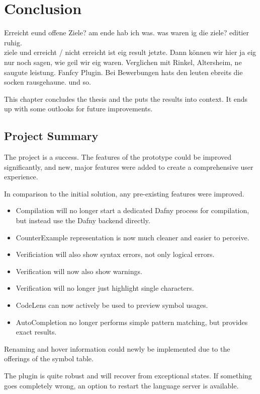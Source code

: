 \section{Conclusion}
\label{section:conclusion}
Erreicht eund offene Ziele? am ende hab ich was. was waren ig die ziele? editier ruhig. \\
ziele und erreicht / nicht erreicht ist eig result jetzte.
Dann können wir hier ja eig nur noch sagen, wie geil wir eig waren.
Verglichen mit Rinkel, Altersheim, ne saugute leistung.
Fanfcy Plugin.
Bei Bewerbungen hats den leuten ebreits die socken rausgehaune. und so.





This chapter concludes the thesis and the puts the results into context.
It ends up with some outlooks for future improvements.

\subsection{Project Summary}
The project is a success.
The features of the prototype could be improved significantly, and new, major features were added to create a comprehensive user experience.

In comparison to the initial solution, any pre-existing features were improved.
\begin{itemize}
 \item Compilation will no longer start a dedicated Dafny process for compilation, but instead use the Dafny backend directly.
 \item CounterExample representation is now much cleaner and easier to perceive.
 \item Verificiation will also show syntax errors, not only logical errors.
 \item Verification will now also show warnings.
 \item Verification will no longer just highlight single characters.
 \item CodeLens can now actively be used to preview symbol usages.
 \item AutoCompletion no longer performs simple pattern matching, but provides exact results.
\end{itemize}
Renaming and hover information could newly be implemented due to the offerings of the symbol table.

The plugin is quite robust and will recover from exceptional states.
If something goes completely wrong, an option to restart the language server is available.\\

